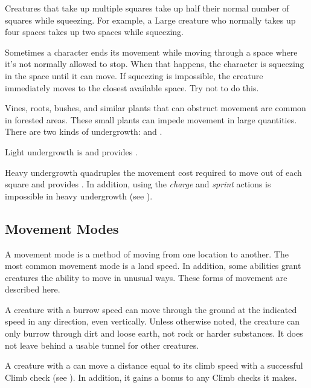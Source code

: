         Creatures that take up multiple squares take up half their normal number of squares while squeezing. For example, a Large creature who normally takes up four spaces takes up two spaces while squeezing.

         Sometimes a character ends its movement while moving through a space where it's not normally allowed to stop. When that happens, the character is squeezing in the space until it can move. If squeezing is impossible, the creature immediately moves to the closest available space. Try not to do this.

        \label{Undergrowth} Vines, roots, bushes, and similar plants that can obstruct movement are common in forested areas.
        These small plants can impede movement in large quantities.
        There are two kinds of undergrowth:  and .

        \label{Light Undergrowth}
        Light undergrowth is  and provides .

        \label{Heavy Undergrowth}
        Heavy undergrowth quadruples the movement cost required to move out of each square and provides .
        In addition, using the \textit{charge} and \textit{sprint} actions is impossible in heavy undergrowth (see ).

    \subsection{Movement Modes}\label{Movement Modes}
        A movement mode is a method of moving from one location to another.
        The most common movement mode is a land speed.
        In addition, some abilities grant creatures the ability to move in unusual ways.
        These forms of movement are described here.

        A creature with a burrow speed can move through the ground at the indicated speed in any direction, even vertically. Unless otherwise noted, the creature can only burrow through dirt and loose earth, not rock or harder substances. It does not leave behind a usable tunnel for other creatures.

        A creature with a  can move a distance equal to its climb speed with a successful Climb check (see ).
        In addition, it gains a  bonus to any Climb checks it makes.

